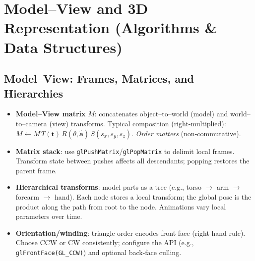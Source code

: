 \documentclass[8pt,twocolumn]{extarticle}
\begin{document}
\section{Model--View and 3D Representation (Algorithms \& Data Structures)}

\subsection*{Model--View: Frames, Matrices, and Hierarchies}
\begin{itemize}
  \item \textbf{Model--View matrix} \(M\): concatenates object--to--world (model) and world--to--camera (view) transforms. Typical composition (right-multiplied): \(M \gets M\,T(\mathbf t)\,R(\theta,\hat{\mathbf a})\,S(s_x,s_y,s_z)\). \emph{Order matters} (non-commutative).
  \item \textbf{Matrix stack}: use \verb|glPushMatrix|/\verb|glPopMatrix| to delimit local frames. Transform state between pushes affects all descendants; popping restores the parent frame.
  \item \textbf{Hierarchical transforms}: model parts as a tree (e.g., torso \(\to\) arm \(\to\) forearm \(\to\) hand). Each node stores a local transform; the global pose is the product along the path from root to the node. Animations vary local parameters over time.
  \item \textbf{Orientation/winding}: triangle order encodes front face (right-hand rule). Choose CCW or CW consistently; configure the API (e.g., \verb|glFrontFace(GL_CCW)|) and optional back-face culling.
\end{itemize}
\end{document}
